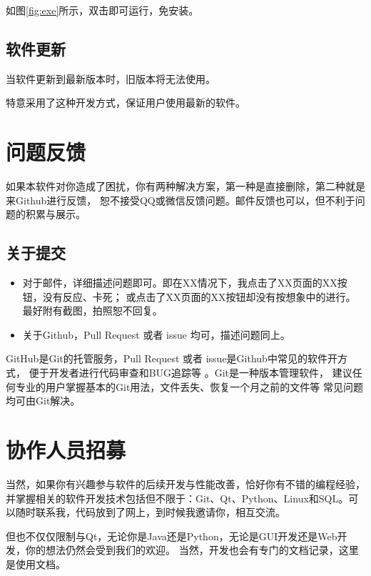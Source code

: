 \documentclass[cn, 11pt, chinese, show]{elegantbook}
\begin{document}
如图\ref{fig:exe}所示，双击即可运行，免安装。

\subsection{软件更新}

当软件更新到最新版本时，旧版本将无法使用。

\begin{remark}
特意采用了这种开发方式，保证用户使用最新的软件。
\end{remark}

\section{问题反馈}

如果本软件对你造成了困扰，你有两种解决方案，第一种是直接删除，第二种就是来Github进行反馈，
恕不接受QQ或微信反馈问题。邮件反馈也可以，但不利于问题的积累与展示。

\subsection{关于提交}

\begin{itemize}
  \item 对于邮件，详细描述问题即可。即在XX情况下，我点击了XX页面的XX按钮，没有反应、卡死；
  或点击了XX页面的XX按钮却没有按想象中的进行。最好附有截图，拍照恕不回复。
  \item 关于Github，Pull Request 或者 issue 均可，描述问题同上。
\end{itemize}

\begin{remark}
    GitHub是Git的托管服务，Pull Request 或者 issue是Github中常见的软件开方式， 便于开发者进行代码审查和BUG追踪等
    。Git是一种版本管理软件， 建议任何专业的用户掌握基本的Git用法，文件丢失、恢复一个月之前的文件等
    常见问题均可由Git解决。
\end{remark}

\section{协作人员招募}

当然，如果你有兴趣参与软件的后续开发与性能改善，恰好你有不错的编程经验，
并掌握相关的软件开发技术包括但不限于：Git、Qt、Python、Linux和SQL。可以随时联系我，代码放到了网上，到时候我邀请你，相互交流。

但也不仅仅限制与Qt，无论你是Java还是Python，无论是GUI开发还是Web开发，你的想法仍然会受到我们的欢迎。
当然，开发也会有专门的文档记录，这里是使用文档。
\end{document}
